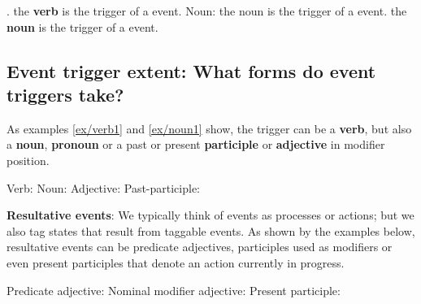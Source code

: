 \begin{exe}
    \ex\label{ex/verb1} .
        \expl the \textbf{verb}  is the trigger of a  event.
    \ex\label{ex/noun1} Noun: 
        \expl the noun  is the trigger of a  event.
    \ex\label{ex/noun2} 
        \expl the \textbf{noun}  is the trigger of a  event.
\end{exe}

\subsection{Event trigger extent: What forms do event triggers take?}
As examples \ref{ex/verb1} and \ref{ex/noun1} show, the trigger can be a \textbf{verb}, but also a \textbf{noun}, \textbf{pronoun} or a past or present \textbf{participle} or \textbf{adjective} in modifier position.

\begin{exe}
    \ex\label{ex/verb2} Verb: 
    \ex\label{ex/noun3} Noun: 
    \ex\label{ex/adjective} Adjective: 
    \ex\label{ex/pastparticiple} Past-participle: 
\end{exe}

\textbf{Resultative events}:
We typically think of events as processes or actions; but we also tag states that result from taggable events.
As shown by the examples below, resultative events can be predicate adjectives, participles used as modifiers or even present participles that denote an action currently in progress.

\begin{exe}
    \ex\label{ex/predicateadjective} Predicate adjective: 
    \ex\label{ex/npadjective} Nominal modifier adjective: 
    \ex\label{ex/presentparticiple} Present participle: 
\end{exe}

